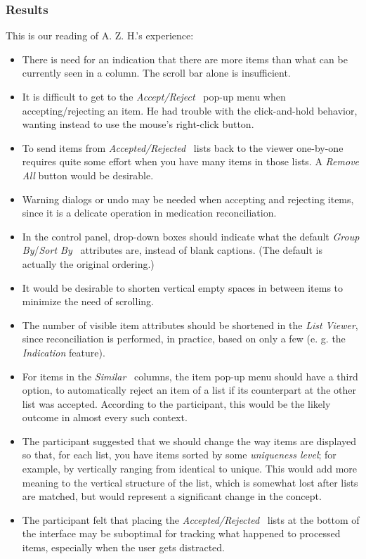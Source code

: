 \documentclass{chi2009}
\newcommand{\ListViewer}{\textit{List Viewer}}
\newcommand{\AcceptReject}{\textit{Accept/Reject}}
\newcommand{\AcceptedRejected}{\textit{Accepted/Rejected}}
\newcommand{\GroupBy}{\textit{Group By}}
\newcommand{\SortBy}{\textit{Sort By}}
\newcommand{\Similar}{\textit{Similar}}
\begin{document}
\subsubsection{Results}
This is our reading of A. Z. H.'s experience:
\begin{itemize}
\item There is need for an indication that there are more items than what can be currently seen in a column. The scroll bar alone is insufficient.
\item It is difficult to get to the \AcceptReject~ pop-up menu when accepting/rejecting an item. He had trouble with the click-and-hold behavior, wanting instead to use the mouse's right-click button.
\item To send items from \AcceptedRejected~ lists back to the viewer one-by-one requires quite some effort when you have many items in those lists. A \textit{Remove All} button would be desirable.
\item Warning dialogs or undo may be needed when accepting and rejecting items, since it is a delicate operation in medication reconciliation.
\item In the control panel, drop-down boxes should indicate what the default \GroupBy/\SortBy~ attributes are, instead of blank captions. (The default is actually the original ordering.)
\item It would be desirable to shorten vertical empty spaces in between items to minimize the need of scrolling.
\item The number of visible item attributes should be shortened in the \ListViewer, since reconciliation is performed, in practice, based on only a few (e. g. the \textit{Indication} feature).
\item For items in the \Similar~ columns, the item pop-up menu should have a third option, to automatically reject an item of a list if its counterpart at the other list was accepted. According to the participant, this would be the likely outcome in almost every such context.
\item The participant suggested that we should change the way items are displayed so that, for each list, you have items sorted by some \textit{uniqueness level}; for example, by vertically ranging from identical to unique. This would add more meaning to the vertical structure of the list, which is somewhat lost after lists are matched, but would represent a significant change in the concept.
\item The participant felt that placing the \AcceptedRejected~ lists at the bottom of the interface may be suboptimal for tracking what happened to processed items, especially when the user gets distracted.

\end{itemize}
\end{document}
